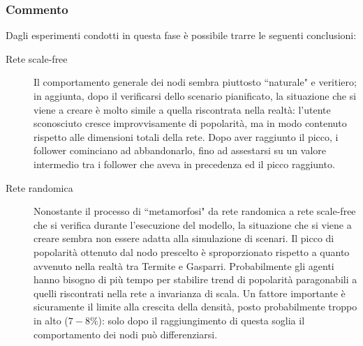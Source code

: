 \documentclass[a4paper,12pt]{article}
\begin{document}
\subsubsection{Commento}
Dagli esperimenti condotti in questa fase è possibile trarre le seguenti conclusioni:
\begin{description}
\item[Rete scale-free] Il comportamento generale dei nodi sembra piuttosto ``naturale" e veritiero; in aggiunta, dopo il verificarsi dello scenario pianificato, la situazione che si viene a creare è molto simile a quella riscontrata nella realtà: l'utente sconosciuto cresce improvvisamente di popolarità, ma in modo contenuto rispetto alle dimensioni totali della rete. Dopo aver raggiunto il picco, i follower cominciano ad abbandonarlo, fino ad assestarsi su un valore intermedio tra i follower che aveva in precedenza ed il picco raggiunto. 
\item[Rete randomica] Nonostante il processo di ``metamorfosi" da rete randomica a rete scale-free che si verifica durante l'esecuzione del modello, la situazione che si viene a creare sembra non essere adatta alla simulazione di scenari. Il picco di popolarità ottenuto dal nodo prescelto è sproporzionato rispetto a quanto avvenuto nella realtà tra Termite e Gasparri.
Probabilmente gli agenti hanno bisogno di più tempo per stabilire trend di popolarità paragonabili a quelli riscontrati nella rete a invarianza di scala. Un fattore importante è sicuramente il limite alla crescita della densità, posto probabilmente troppo in alto ($7-8\%$): solo dopo il raggiungimento di questa soglia il comportamento dei nodi può differenziarsi.
\end{description}
\end{document}
